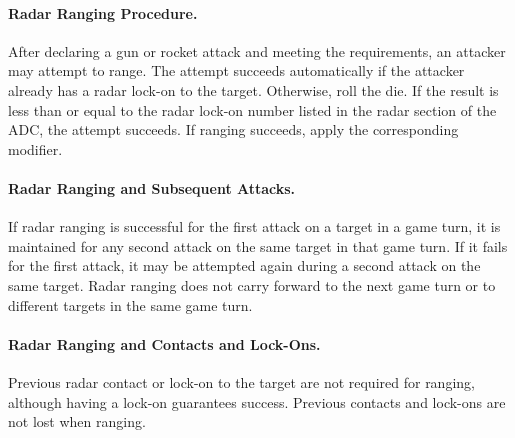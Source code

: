 \begin{advancedrules}
{\begin{itemize}
\end{itemize}

\paragraph{Radar Ranging Procedure.} After declaring a gun or rocket attack and meeting the requirements, an attacker may attempt to range. The attempt succeeds automatically if the attacker already has a radar lock-on to the target. Otherwise, roll the die. If the result is less than or equal to the radar lock-on number listed in the radar section of the ADC, the attempt succeeds. If ranging succeeds, apply the corresponding modifier.

\paragraph{Radar Ranging and Subsequent Attacks.} If radar ranging is successful for the first attack on a target in a game turn, it is maintained for any second attack on the same target in that game turn. If it fails for the first attack, it may be attempted again during a second attack on the same target. Radar ranging does not carry forward to the next game turn or to different targets in the same game turn.

\paragraph{Radar Ranging and Contacts and Lock-Ons.}
Previous radar contact or lock-on to the target are not required for ranging, although having a lock-on guarantees success. Previous contacts and lock-ons are not lost when ranging. 

}



\end{advancedrules}
